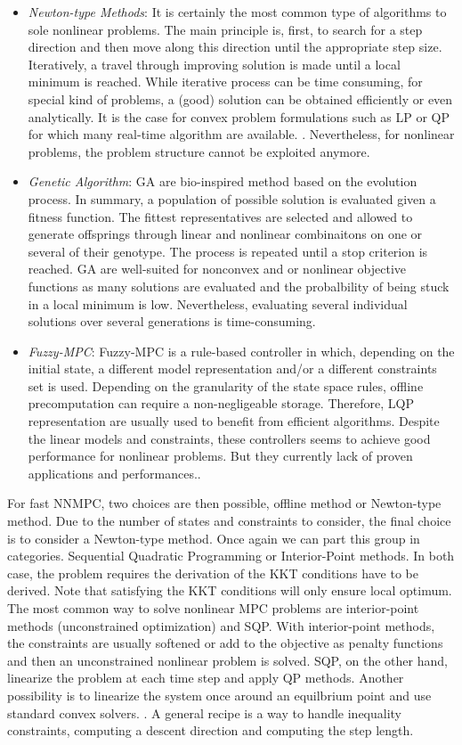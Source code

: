 \documentclass[a4paper, 12pt]{report}
\begin{document}
\begin{itemize}
\item \emph{Newton-type Methods}: It is certainly the most common type of algorithms to sole nonlinear problems. The main principle is, first, to search for a step direction and then move along this direction until the appropriate step size. Iteratively, a travel through improving solution is made until a local minimum is reached. While iterative process can be time consuming, for special kind of problems, a (good) solution can be obtained efficiently or even analytically. It is the case for convex problem formulations such as LP or QP for which many real-time algorithm are available. \cite{Nocedal1999, Wang2008}. Nevertheless, for nonlinear problems, the problem structure cannot be exploited anymore. 
\item \emph{Genetic Algorithm}: GA are bio-inspired method based on the evolution process. In summary, a population of possible solution is evaluated given a fitness function. The fittest representatives are selected and allowed to generate offsprings through linear and nonlinear combinaitons on one or several of their genotype. The process is repeated until a stop criterion is reached. GA are well-suited for nonconvex and or nonlinear objective functions as many solutions are evaluated and the probalbility of being stuck in a local minimum is low. Nevertheless, evaluating several individual solutions over several generations is time-consuming. \cite{Zheng2015}
\item \emph{Fuzzy-MPC}: Fuzzy-MPC is a rule-based controller in which, depending on the initial state, a different model representation and/or a different constraints set is used. Depending on the granularity of the state space rules, offline precomputation can require a non-negligeable storage. Therefore, LQP representation are usually used to benefit from efficient algorithms. Despite the linear models and constraints, these controllers seems to achieve good performance for nonlinear problems. But they currently lack of proven applications and performances.\cite{Zheng2015}.
\end{itemize}


For fast NNMPC, two choices are then possible, offline method or Newton-type method. Due to the number of states and constraints to consider, the final choice is to consider a Newton-type method. Once again we can part this group in categories. Sequential Quadratic Programming or Interior-Point methods. 
In both case, the problem requires the derivation of the KKT conditions have to be derived. Note that satisfying the KKT conditions will only ensure local optimum. The most common way to solve nonlinear MPC problems are interior-point methods (unconstrained optimization) and SQP. With interior-point methods, the constraints are usually softened or add to the objective as penalty functions and then an unconstrained nonlinear problem is solved. SQP, on the other hand, linearize the problem at each time step and apply QP methods. Another possibility is to linearize the system once around an equilbrium point and use standard convex solvers. \cite{Haverbeke2011, Nocedal1999, Zheng2015}. A general recipe is a way to handle inequality constraints, computing a descent direction and computing the step length.
\end{document}
